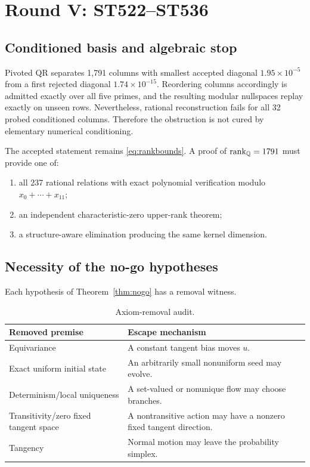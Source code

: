 \documentclass[11pt,a4paper]{article}
\theoremstyle{definition}\newtheorem{definition}[theorem]{Definition}
\theoremstyle{remark}\newtheorem{remark}[theorem]{Remark}
\begin{document}
\section{Round V: ST522--ST536}

\subsection{Conditioned basis and algebraic stop}

Pivoted QR separates 1,791 columns with smallest accepted diagonal $1.95\times10^{-5}$ from a first rejected diagonal $1.74\times10^{-15}$. Reordering columns accordingly is admitted exactly over all five primes, and the resulting modular nullspaces replay exactly on unseen rows. Nevertheless, rational reconstruction fails for all 32 probed conditioned columns. Therefore the obstruction is not cured by elementary numerical conditioning.

The accepted statement remains \eqref{eq:rankbounds}. A proof of $\operatorname{rank}_{\mathbb Q}=1791$ must provide one of:
\begin{enumerate}
\item all 237 rational relations with exact polynomial verification modulo $x_0+\cdots+x_{11}$;
\item an independent characteristic-zero upper-rank theorem;
\item a structure-aware elimination producing the same kernel dimension.
\end{enumerate}

\subsection{Necessity of the no-go hypotheses}

Each hypothesis of Theorem~\ref{thm:nogo} has a removal witness.

\begin{table}[H]\centering\caption{Axiom-removal audit.}
\begin{tabularx}{\textwidth}{@{}p{}X@{}}\toprule Removed premise&Escape mechanism\\\midrule
Equivariance&A constant tangent bias moves $u$.\\
Exact uniform initial state&An arbitrarily small nonuniform seed may evolve.\\
Determinism/local uniqueness&A set-valued or nonunique flow may choose branches.\\
Transitivity/zero fixed tangent space&A nontransitive action may have a nonzero fixed tangent direction.\\
Tangency&Normal motion may leave the probability simplex.\\\bottomrule
\end{tabularx}\end{table}
\end{document}
